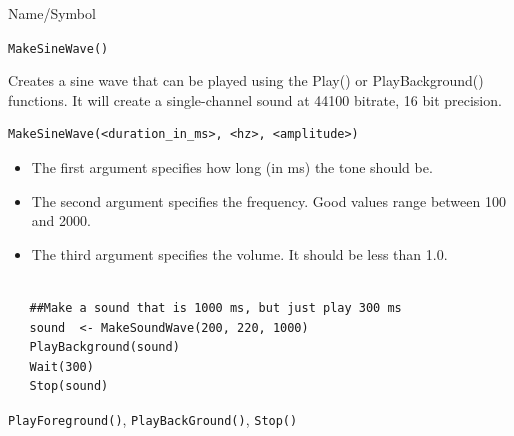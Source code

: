 \begin{desc}{Name/Symbol}
\item[Name/Symbol]	\verb+MakeSineWave()+

\item[Description] 
Creates a sine wave that can be played using the Play() or PlayBackground() functions.  It will create a single-channel sound at 44100 bitrate, 16 bit precision.

\item[Usage]
\begin{verbatim}
MakeSineWave(<duration_in_ms>, <hz>, <amplitude>)
\end{verbatim}
\begin{itemize}
 \item  The first argument specifies how long (in ms) the tone should be.
 \item The second argument specifies the frequency.  Good values range between 100 and 2000.
 \item The third argument specifies the volume.  It should be less than 1.0.
 \end{itemize}
 
\item[Example]	
\begin{verbatim}

   ##Make a sound that is 1000 ms, but just play 300 ms
   sound  <- MakeSoundWave(200, 220, 1000)
   PlayBackground(sound)
   Wait(300)
   Stop(sound)

\end{verbatim}

\item[See Also]    	\verb+PlayForeground()+, \verb+PlayBackGround()+, \verb+Stop()+
\end{desc}






